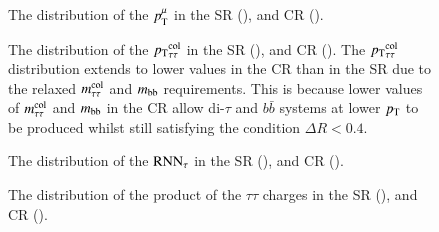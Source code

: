     \begin{figure}[htbp]
        
        \centering
        \caption{
            The distribution of the $p_{\text{T}}^\mathrm{\mu}$ in the SR (\protect{}), and CR (\protect{}).
        }
        \label{fig:2p_pTmu}
    \end{figure}

    \begin{figure}[htbp]
        
        \centering
        \caption{
            The distribution of the $p_{\text{T}}{}_\mathrm{\tau\tau}^\mathrm{col}$ in the SR (\protect{}), and CR (\protect{}).
            The $p_{\text{T}}{}_\mathrm{\tau\tau}^\mathrm{col}$ distribution extends to lower values in the CR than in the SR due to the relaxed $m_\mathrm{\tau\tau}^\mathrm{col}$ and $m_\mathrm{bb}$ requirements.  
            This is because lower values of $m_\mathrm{\tau\tau}^\mathrm{col}$ and $m_\mathrm{bb}$ in the CR allow di-$\tau$ and $b\bar{b}$ systems at 
            lower $p_{\text{T}}$ to be produced whilst still satisfying the condition $\Delta{R} < 0.4$.
        }
        \label{fig:2p_pTtt}
    \end{figure}

    \begin{figure}[htbp]
    
        \centering
        \caption{
            The distribution of the $\mathrm{RNN}_\mathrm{\tau}$ in the SR (\protect{}), and CR (\protect{}).
        }
        \label{fig:2p_tau_rnn}
    \end{figure}

    \begin{figure}[htbp]
        \centering
        \caption{
            The distribution of the product of the $\tau\tau$ charges in the SR (\protect{}), and CR (\protect{}).
        }
        \label{fig:2p_qq}
    \end{figure}
    

